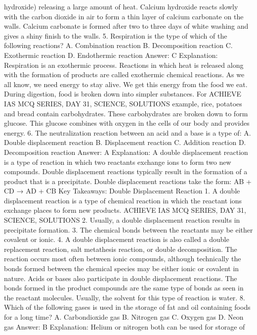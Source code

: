 hydroxide) releasing a large amount of heat. Calcium hydroxide
reacts slowly with the carbon dioxide in air to form a thin layer of
calcium carbonate on the walls. Calcium carbonate is formed after
two to three days of white washing and gives a shiny finish to the
walls.
5. Respiration is the type of which of the following reactions?
A. Combination reaction
B. Decomposition reaction
C. Exothermic reaction
D. Endothermic reaction
Answer: C
Explanation: Respiration is an exothermic process. Reactions in
which heat is released along with the formation of products are
called exothermic chemical reactions. As we all know, we need
energy to stay alive. We get this energy from the food we eat.
During digestion, food is broken down into simpler substances. For
ACHIEVE IAS MCQ SERIES, DAY 31, SCIENCE, SOLUTIONS
example, rice, potatoes and bread contain carbohydrates. These
carbohydrates are broken down to form glucose. This glucose
combines with oxygen in the cells of our body and provides energy.
6. The neutralization reaction between an acid and a base is a
type of:
A. Double displacement reaction
B. Displacement reaction
C. Addition reaction
D. Decomposition reaction
Answer: A
Explanation: A double displacement reaction is a type of reaction in
which two reactants exchange ions to form two new compounds.
Double displacement reactions typically result in the formation of a
product that is a precipitate.
Double displacement reactions take the form:
AB + CD → AD + CB
Key Takeaways: Double Displacement Reaction
1. A double displacement reaction is a type of chemical reaction in
which the reactant ions exchange places to form new products.
ACHIEVE IAS MCQ SERIES, DAY 31, SCIENCE, SOLUTIONS
2. Usually, a double displacement reaction results in precipitate
formation.
3. The chemical bonds between the reactants may be either covalent
or ionic.
4. A double displacement reaction is also called a double replacement
reaction, salt metathesis reaction, or double decomposition.
The reaction occurs most often between ionic compounds, although
technically the bonds formed between the chemical species may be
either ionic or covalent in nature. Acids or bases also participate in
double displacement reactions. The bonds formed in the product
compounds are the same type of bonds as seen in the reactant
molecules. Usually, the solvent for this type of reaction is water.
8. Which of the following gases is used in the storage of fat and
oil containing foods for a long time?
A. Carbondioxide gas
B. Nitrogen gas
C. Oxygen gas
D. Neon gas
Answer: B
Explanation: Helium or nitrogen both can be used for storage of

